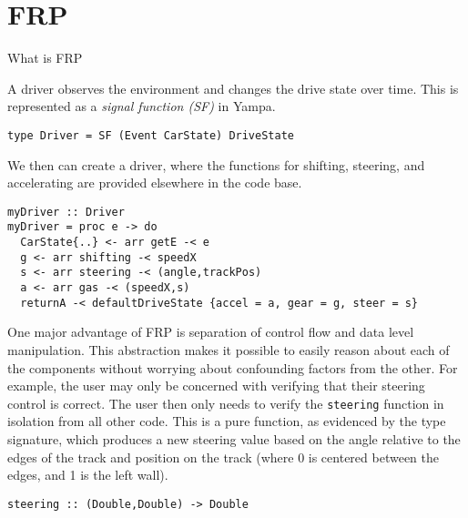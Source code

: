 \section{FRP}

What is FRP

A driver observes the environment and changes the drive state over time.
This is represented as a \textit{signal function (SF)} in Yampa.

\begin{lstlisting}
type Driver = SF (Event CarState) DriveState
\end{lstlisting}

We then can create a driver, where the functions for shifting, steering, and accelerating are provided elsewhere in the code base.

\begin{lstlisting}
myDriver :: Driver
myDriver = proc e -> do
  CarState{..} <- arr getE -< e
  g <- arr shifting -< speedX
  s <- arr steering -< (angle,trackPos)
  a <- arr gas -< (speedX,s)
  returnA -< defaultDriveState {accel = a, gear = g, steer = s}
\end{lstlisting}

One major advantage of FRP is separation of control flow and data level manipulation. 
This abstraction makes it possible to easily reason about each of the components without worrying about confounding factors from the other.
For example, the user may only be concerned with verifying that their steering control is correct.
The user then only needs to verify the \texttt{steering} function in isolation from all other code.
This is a pure function, as evidenced by the type signature, which produces a new steering value based on the angle relative to the edges of the track and position on the track (where 0 is centered between the edges, and 1 is the left wall).

\begin{lstlisting}
steering :: (Double,Double) -> Double
\end{lstlisting}

